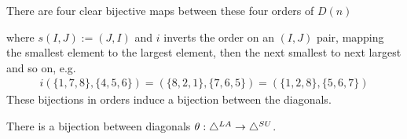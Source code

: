 There are four clear bijective maps between these four orders of $D(n)$
\begin{center}
\end{center}
where $s(I,J):=(J,I)$ and $i$ inverts the order on an $(I,J)$ pair, mapping the smallest element to the largest element, then the next smallest to next largest and so on, e.g. 
\begin{align*}
    i(\{1, 7, 8\} , \{ 4, 5, 6 \}) = (\{8,2,1\},\{7,6,5\}) = (\{1,2,8\},\{5,6,7\})
\end{align*}
These bijections in orders induce a bijection between the diagonals. 
\begin{proposition}
There is a bijection between diagonals $\theta:\triangle^{LA} \to \triangle^{SU}$.
\end{proposition}
